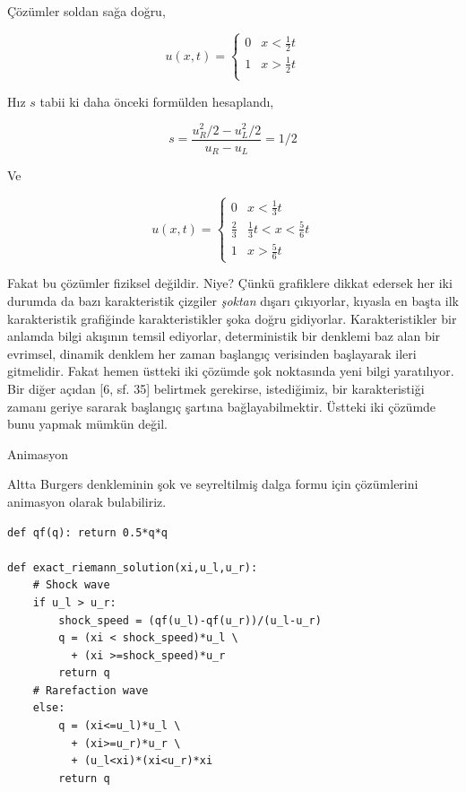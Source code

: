 \documentclass[12pt,fleqn]{article}\usepackage{../../common}
\begin{document}
Çözümler soldan sağa doğru,

$$
u(x,t) =
\left\{ \begin{array}{ll}
0 & x < \frac{1}{2} t  \\
1 & x > \frac{1}{2} t  \\
\end{array} \right.
$$

Hız $s$ tabii ki daha önceki formülden hesaplandı, 

$$
s = \frac{u_R^2 / 2 - u_L^2 / 2 }{u_R - u_L} = 1/2
$$

Ve

$$
u(x,t) =
\left\{ \begin{array}{ll}
0 & x < \frac{1}{3} t  \\
\frac{2}{3} & \frac{1}{3} t < x < \frac{5}{6} t  \\
1 & x > \frac{5}{6} t  
\end{array} \right.
$$

Fakat bu çözümler fiziksel değildir. Niye? Çünkü grafiklere dikkat edersek
her iki durumda da bazı karakteristik çizgiler {\em şoktan} dışarı çıkıyorlar,
kıyasla en başta ilk karakteristik grafiğinde karakteristikler şoka doğru
gidiyorlar. Karakteristikler bir anlamda bilgi akışının temsil ediyorlar,
deterministik bir denklemi baz alan bir evrimsel, dinamik denklem her zaman
başlangıç verisinden başlayarak ileri gitmelidir. Fakat hemen üstteki iki
çözümde şok noktasında yeni bilgi yaratılıyor. Bir diğer açıdan [6, sf. 35]
belirtmek gerekirse, istediğimiz, bir karakteristiği zamanı geriye sararak
başlangıç şartına bağlayabilmektir. Üstteki iki çözümde bunu yapmak mümkün değil. 

Animasyon

Altta Burgers denkleminin şok ve seyreltilmiş dalga formu için çözümlerini
animasyon olarak bulabiliriz.

\begin{verbatim}
def qf(q): return 0.5*q*q
    
def exact_riemann_solution(xi,u_l,u_r):
    # Shock wave
    if u_l > u_r: 
        shock_speed = (qf(u_l)-qf(u_r))/(u_l-u_r)
        q = (xi < shock_speed)*u_l \
          + (xi >=shock_speed)*u_r
        return q
    # Rarefaction wave
    else:  
        q = (xi<=u_l)*u_l \
          + (xi>=u_r)*u_r \
          + (u_l<xi)*(xi<u_r)*xi
        return q
\end{verbatim}
\end{document}
